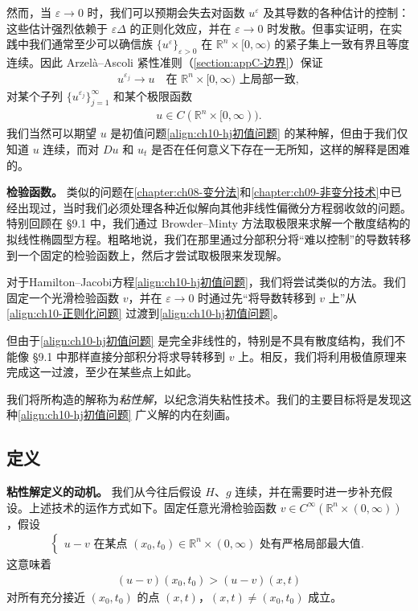 \documentclass[../../main.tex]{subfiles}
\begin{document}
然而，当 $\varepsilon\to 0$ 时，我们可以预期会失去对函数 $u^\varepsilon$ 及其导数的各种估计的控制：这些估计强烈依赖于 $\varepsilon\Delta$ 的正则化效应，并在 $\varepsilon\to 0$ 时发散。但事实证明，在实践中我们通常至少可以确信族 $\{u^\varepsilon\}_{\varepsilon>0}$ 在 $\mathbb{R}^n\times[0,\infty)$ 的紧子集上一致有界且等度连续。因此 Arzel\`a--Ascoli 紧性准则（\cref{section:appC-边界}）保证
\begin{align}
u^{\varepsilon_j} \to u \quad \text{在 } \mathbb{R}^n\times[0,\infty) \text{ 上局部一致},
\label{align:ch10-局部一致收敛}
\end{align}
对某个子列 $\{u^{\varepsilon_j}\}_{j=1}^\infty$ 和某个极限函数
\begin{align}
u \in C(\mathbb{R}^n\times[0,\infty)).
\label{align:ch10-连续极限}
\end{align}
我们当然可以期望 $u$ 是初值问题\eqref{align:ch10-hj初值问题} 的某种解，但由于我们仅知道 $u$ 连续，而对 $Du$ 和 $u_t$ 是否在任何意义下存在一无所知，这样的解释是困难的。

\textbf{检验函数。} 类似的问题在\cref{chapter:ch08-变分法}和\cref{chapter:ch09-非变分技术}中已经出现过，当时我们必须处理各种近似解向其他非线性偏微分方程弱收敛的问题。特别回顾在 \S9.1 中，我们通过 Browder--Minty 方法取极限来求解一个散度结构的拟线性椭圆型方程。粗略地说，我们在那里通过分部积分将``难以控制''的导数转移到一个固定的检验函数上，然后才尝试取极限来发现解。

对于Hamilton--Jacobi方程\eqref{align:ch10-hj初值问题}，我们将尝试类似的方法。我们固定一个光滑检验函数 $v$，并在 $\varepsilon\to 0$ 时通过先``将导数转移到 $v$ 上''从\eqref{align:ch10-正则化问题} 过渡到\eqref{align:ch10-hj初值问题}。

但由于\eqref{align:ch10-hj初值问题} 是完全非线性的，特别是不具有散度结构，我们不能像 \S9.1 中那样直接分部积分将求导转移到 $v$ 上。相反，我们将利用极值原理来完成这一过渡，至少在某些点上如此。

我们将所构造的解称为\emph{粘性解}，以纪念消失粘性技术。我们的主要目标将是发现这种\eqref{align:ch10-hj初值问题} 广义解的内在刻画。

\subsection{定义}\label{subsection:ch10-粘性解定义}

\textbf{粘性解定义的动机。} 我们从今往后假设 $H$、$g$ 连续，并在需要时进一步补充假设。上述技术的运作方式如下。固定任意光滑检验函数 $v\in C^\infty(\mathbb{R}^n\times(0,\infty))$，假设
\begin{align}
\begin{cases}
u-v \text{ 在某点 } (x_0,t_0)\in\mathbb{R}^n\times(0,\infty) \text{ 处有严格局部最大值}.
\end{cases}
\label{align:ch10-严格局部最大假设}
\end{align}
这意味着
\begin{align*}
(u-v)(x_0,t_0) > (u-v)(x,t)
\end{align*}
对所有充分接近 $(x_0,t_0)$ 的点 $(x,t)$，$(x,t)\neq(x_0,t_0)$ 成立。
\end{document}
